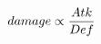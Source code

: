 \documentclass[preview]{standalone}
\begin{document}
\begin{align*}
\special{dvisvgm:raw <g id='unique000'>}damage \propto \frac{Atk}{Def}\special{dvisvgm:raw </g>}
\end{align*}
\end{document}
